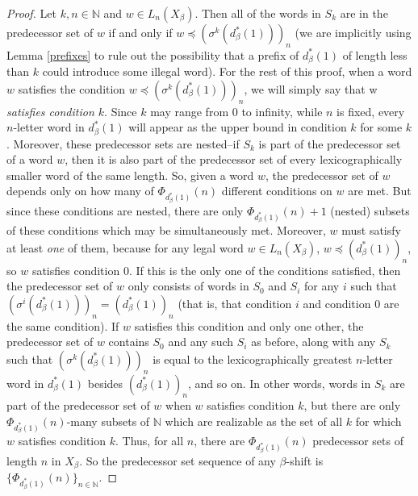 \documentclass{amsart}
\theoremstyle{definition}
\numberwithin{equation}{section}
\begin{document}
\begin{proof}
Let $k, n \in \mathbb{N}$ and $w \in L_n(X_\beta)$. Then all of the words in $S_k$ are in the predecessor set of $w$ if and only if $w \preceq (\sigma^k(d_\beta^* (1)))_n$ (we are implicitly using Lemma \ref{prefixes} to rule out the possibility that a prefix of $d_\beta^* (1)$ of length less than $k$ could introduce some illegal word). For the rest of this proof, when a word $w$ satisfies the condition $w \preceq (\sigma^k(d_\beta^* (1)))_n$, we will simply say that w \textit{satisfies condition $k$}. Since $k$ may range from $0$ to infinity, while $n$ is fixed, every $n$-letter word in $d_\beta^* (1)$ will appear as the upper bound in condition $k$ for some $k$. Moreover, these predecessor sets are nested--if $S_k$ is part of the predecessor set of a word $w$, then it is also part of the predecessor set of every lexicographically smaller word of the same length. So, given a word $w$, the predecessor set of $w$ depends only on how many of $\Phi_{d_\beta^*(1)}(n)$ different conditions on $w$ are met. But since these conditions are nested, there are only $\Phi_{d_\beta^* (1)}(n)+1$ (nested) subsets of these conditions which may be simultaneously met. Moreover, $w$ must satisfy at least \textit{one} of them, because for any legal word $w \in L_n(X_\beta)$, $w \preceq (d_\beta^* (1))_n$, so $w$ satisfies condition 0. If this is the only one of the conditions satisfied, then the predecessor set of $w$ only consists of words in $S_0$ and $S_i$ for any $i$ such that $(\sigma^i(d_\beta^*(1)))_n = (d_\beta^*(1))_n$ (that is, that condition $i$ and condition 0 are the same condition). If $w$ satisfies this condition and only one other, the predecessor set of $w$ contains $S_0$ and any such $S_i$ as before, along with any $S_k$ such that $(\sigma^k(d_\beta^* (1)))_n$ is equal to the lexicographically greatest $n$-letter word in $d_\beta^* (1)$ besides $(d_\beta^* (1))_n$, and so on. In other words, words in $S_k$ are part of the predecessor set of $w$ when $w$ satisfies condition $k$, but there are only $\Phi_{d_\beta^* (1)}(n)$-many subsets of $\mathbb{N}$ which are realizable as the set of all $k$ for which $w$ satisfies condition $k$. Thus, for all $n$, there are $\Phi_{d_\beta^* (1)}(n)$ predecessor sets of length $n$ in $X_\beta$. So the predecessor set sequence of any $\beta$-shift is $\{\Phi_{d_\beta^* (1)}(n)\}_{n \in \mathbb{N}}$.

\end{proof}
\end{document}
